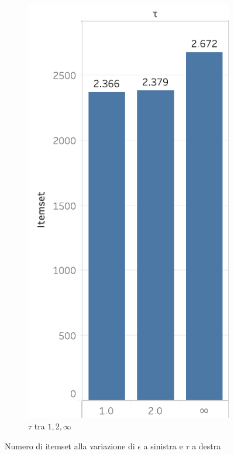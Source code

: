 \begin{figure}
\begin{subfigure}{.5\textwidth}
   \includegraphics[scale=0.5]{res/fig/sec-4/itemset/ItemesetTau.pdf}
   \caption{\(\tau\) tra \(1,2,\infty\)}%
  \label{fig:chap-4:ItemsetTau}
  \end{subfigure}%
  \caption{Numero di itemset alla variazione di \(\epsilon\) a sinistra e \(\tau\) a destra}%
  \label{fig:chap-4:ItemsetEpsilonAndTau}
\end{figure}


